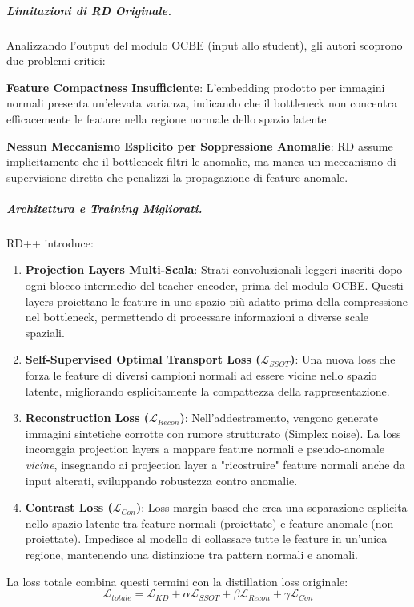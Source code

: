\subparagraph{Limitazioni di RD Originale.}

Analizzando l'output del modulo OCBE (input allo student), gli autori scoprono due problemi critici:

\textbf{Feature Compactness Insufficiente}: L'embedding prodotto per im\-ma\-gi\-ni normali presenta un'elevata varianza, indicando che il bottleneck non concentra efficacemente le feature nella regione normale dello spazio latente

\textbf{Nessun Meccanismo Esplicito per Soppressione Anomalie}: RD assume implicitamente che il bottleneck filtri le anomalie, ma manca un mec\-ca\-nis\-mo di supervisione diretta che penalizzi la propagazione di feature anomale.

\subparagraph{Architettura e Training Migliorati.}

RD++ introduce:
\begin{enumerate}
    \item \textbf{Projection Layers Multi-Scala}: Strati convoluzionali leggeri inseriti dopo ogni blocco intermedio del teacher encoder, prima del modulo OCBE. Questi layers proiettano le feature in uno spazio più adatto prima della compressione nel bottleneck, permettendo di processare informazioni a diverse scale spaziali.
    \item \textbf{Self-Supervised Optimal Transport Loss ($\mathcal{L}_{SSOT}$)}: Una nuova loss che forza le feature di diversi campioni normali ad essere vicine nello spazio latente, migliorando esplicitamente la compattezza della rappresentazione.
    \item \textbf{Reconstruction Loss ($\mathcal{L}_{Recon}$)}: Nell'addestramento, vengono ge\-ne\-ra\-te immagini sintetiche corrotte con rumore strutturato (Simplex noise). La loss incoraggia projection layers a mappare feature normali e pseudo-anomale \textit{vicine}, insegnando ai projection layer a "ricostruire" feature nor\-ma\-li anche da input alterati, sviluppando robustezza contro anomalie.
    \item \textbf{Contrast Loss ($\mathcal{L}_{Con}$)}: Loss margin-based che crea una separazione esplicita nello spazio latente tra feature normali (proiettate) e feature anomale (non proiettate). Impedisce al modello di collassare tutte le feature in un'unica regione, mantenendo una distinzione tra pattern normali e anomali.
\end{enumerate}

La loss totale combina questi termini con la distillation loss originale:
\begin{equation}
\mathcal{L}_{totale} = \mathcal{L}_{KD} + \alpha\mathcal{L}_{SSOT} + \beta\mathcal{L}_{Recon} + \gamma\mathcal{L}_{Con}
\end{equation}


